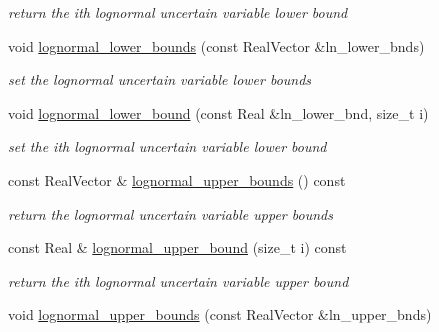 \begin{DoxyCompactItemize}
\begin{DoxyCompactList}\small\item\em return the ith lognormal uncertain variable lower bound \end{DoxyCompactList}\item 
void \hyperlink{classPecos_1_1AleatoryDistParams_ad2b133c356032e220fcda6675c833bef}{lognormal\+\_\+lower\+\_\+bounds} (const Real\+Vector \&ln\+\_\+lower\+\_\+bnds)\label{classPecos_1_1AleatoryDistParams_ad2b133c356032e220fcda6675c833bef}

\begin{DoxyCompactList}\small\item\em set the lognormal uncertain variable lower bounds \end{DoxyCompactList}\item 
void \hyperlink{classPecos_1_1AleatoryDistParams_ab88419f159a6de25acac2f159cccd0fd}{lognormal\+\_\+lower\+\_\+bound} (const Real \&ln\+\_\+lower\+\_\+bnd, size\+\_\+t i)\label{classPecos_1_1AleatoryDistParams_ab88419f159a6de25acac2f159cccd0fd}

\begin{DoxyCompactList}\small\item\em set the ith lognormal uncertain variable lower bound \end{DoxyCompactList}\item 
const Real\+Vector \& \hyperlink{classPecos_1_1AleatoryDistParams_a5ca3f3591255578d7a3644b971d86e0f}{lognormal\+\_\+upper\+\_\+bounds} () const \label{classPecos_1_1AleatoryDistParams_a5ca3f3591255578d7a3644b971d86e0f}

\begin{DoxyCompactList}\small\item\em return the lognormal uncertain variable upper bounds \end{DoxyCompactList}\item 
const Real \& \hyperlink{classPecos_1_1AleatoryDistParams_a2ce7f38ab2b8939e89bde7ad45a54d6e}{lognormal\+\_\+upper\+\_\+bound} (size\+\_\+t i) const \label{classPecos_1_1AleatoryDistParams_a2ce7f38ab2b8939e89bde7ad45a54d6e}

\begin{DoxyCompactList}\small\item\em return the ith lognormal uncertain variable upper bound \end{DoxyCompactList}\item 
void \hyperlink{classPecos_1_1AleatoryDistParams_a701fcd5fcb33882167bd1b2137e15780}{lognormal\+\_\+upper\+\_\+bounds} (const Real\+Vector \&ln\+\_\+upper\+\_\+bnds)\label{classPecos_1_1AleatoryDistParams_a701fcd5fcb33882167bd1b2137e15780}


\end{DoxyCompactItemize}
